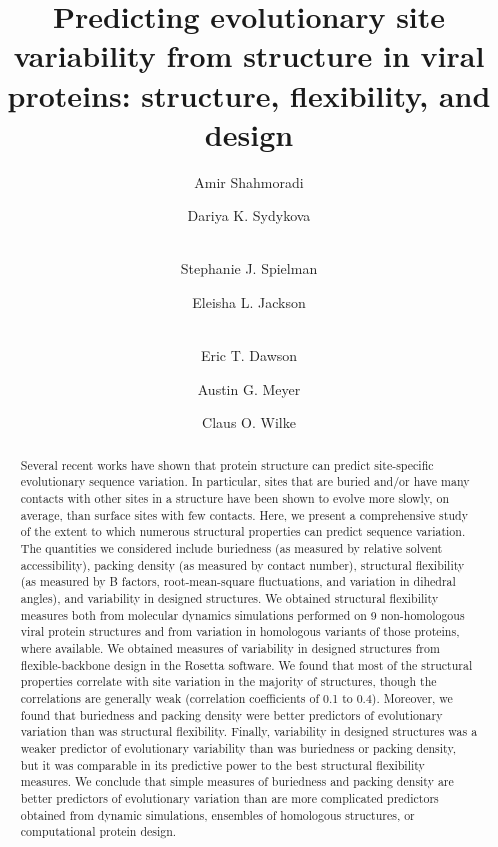 \documentclass[smallextended]{svjour3}
\begin{document}
\title{Predicting evolutionary site variability from structure in viral proteins: structure, flexibility, and design}

\author{Amir Shahmoradi \and Dariya K. Sydykova \and \\ Stephanie J. Spielman \and Eleisha L. Jackson \and \\ Eric T. Dawson \and Austin G. Meyer \and Claus O. Wilke}


\date{}

\maketitle

\begin{abstract}
Several recent works have shown that protein structure can predict site-specific evolutionary sequence variation. In particular, sites that are buried and/or have many contacts with other sites in a structure have been shown to evolve more slowly, on average, than surface sites with few contacts. Here, we present a comprehensive study of the extent to which numerous structural properties can predict sequence variation. The quantities we considered include buriedness (as measured by relative solvent accessibility), packing density (as measured by contact number), structural flexibility (as measured by B factors, root-mean-square fluctuations, and variation in dihedral angles), and variability in designed structures. We obtained structural flexibility measures both from molecular dynamics simulations performed on 9 non-homologous viral protein structures and from variation in homologous variants of those proteins, where available. We obtained measures of variability in designed structures from flexible-backbone design in the Rosetta software. We found that most of the structural properties correlate with site variation in the majority of structures, though the correlations are generally weak (correlation coefficients of 0.1 to 0.4). Moreover, we found that buriedness and packing density were better predictors of evolutionary variation than was structural flexibility. Finally, variability in designed structures was a weaker predictor of evolutionary variability than was buriedness or packing density, but it was comparable in its predictive power to the best structural flexibility measures. We conclude that simple measures of buriedness and packing density are better predictors of evolutionary variation than are more complicated predictors obtained from dynamic simulations, ensembles of homologous structures, or computational protein design.
\end{abstract}
\end{document}
